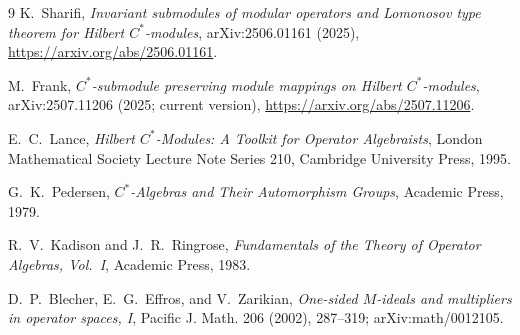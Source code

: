 \documentclass[11pt]{article}
\begin{document}
\begin{thebibliography}{9}
K.~Sharifi,
\emph{Invariant submodules of modular operators and Lomonosov type theorem
for Hilbert $C^*$-modules}, arXiv:2506.01161 (2025),
\url{https://arxiv.org/abs/2506.01161}.

M.~Frank,
\emph{$C^*$-submodule preserving module mappings on Hilbert $C^*$-modules},
arXiv:2507.11206 (2025; current version),
\url{https://arxiv.org/abs/2507.11206}.

E.~C.~Lance,
\emph{Hilbert $C^*$-Modules: A Toolkit for Operator Algebraists},
London Mathematical Society Lecture Note Series 210, Cambridge University
Press, 1995.

G.~K.~Pedersen,
\emph{$C^*$-Algebras and Their Automorphism Groups},
Academic Press, 1979.

R.~V.~Kadison and J.~R.~Ringrose,
\emph{Fundamentals of the Theory of Operator Algebras, Vol.~I},
Academic Press, 1983.

D.~P.~Blecher, E.~G.~Effros, and V.~Zarikian,
\emph{One-sided $M$-ideals and multipliers in operator spaces, I},
Pacific J. Math. 206 (2002), 287--319;
arXiv:math/0012105.
\end{thebibliography}
\end{document}
